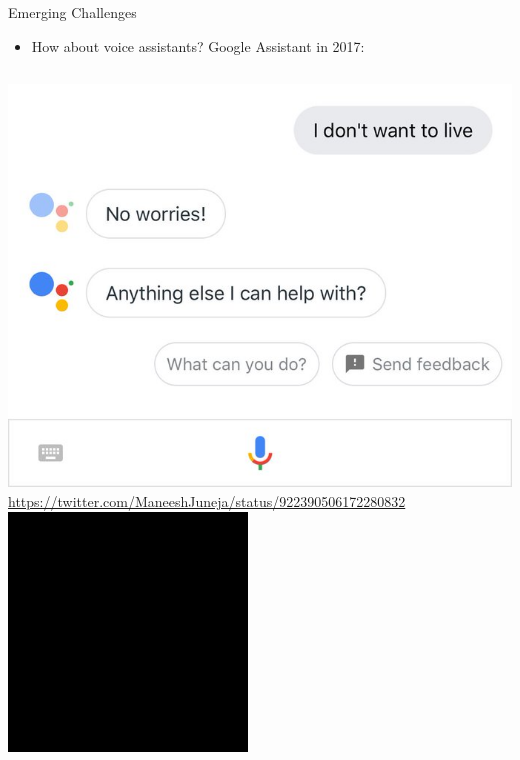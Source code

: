 \documentclass[nobackground,dvipsnames,table,aspectratio=169]{beamer}
\begin{document}
\begin{frame}{Emerging Challenges}
    \begin{itemize}
        \item How about voice assistants? Google Assistant in 2017:
    \end{itemize}
    \vspace{0.01\textheight}
    \begin{columns}
            \includegraphics[width=\textwidth]{google-assistant-2017-text}
            \tiny
            \url{https://twitter.com/ManeeshJuneja/status/922390506172280832}
            \href{https://drive.google.com/file/d/1c-85YMp_Q-77P-phGZ_S-EI1lzDLfrv-/view}{\includegraphics[width=\textwidth]{google-assistant-video}}
    \end{columns}
\end{frame}
\end{document}
